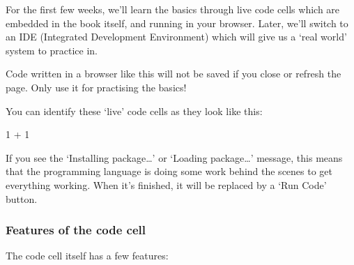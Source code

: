 \documentclass[
  letterpaper,
  DIV=11,
  numbers=noendperiod]{scrreprt}
\newenvironment{Shaded}{\begin{snugshade}}{\end{snugshade}}
\newcommand{\NormalTok}[1]{\textcolor[rgb]{0.00,0.23,0.31}{#1}}
\begin{document}
For the first few weeks, we'll learn the basics through live code cells
which are embedded in the book itself, and running in your browser.
Later, we'll switch to an IDE (Integrated Development Environment) which
will give us a `real world' system to practice in.

\begin{tcolorbox}[enhanced jigsaw, coltitle=black, bottomrule=.15mm, title=\textcolor{quarto-callout-warning-color}{\faExclamationTriangle}\hspace{0.5em}{Warning}, leftrule=.75mm, colframe=quarto-callout-warning-color-frame, breakable, toprule=.15mm, opacityback=0, bottomtitle=1mm, toptitle=1mm, colback=white, rightrule=.15mm, titlerule=0mm, left=2mm, arc=.35mm, opacitybacktitle=0.6, colbacktitle=quarto-callout-warning-color!10!white]

Code written in a browser like this will not be saved if you close or
refresh the page. Only use it for practising the basics!

\end{tcolorbox}

You can identify these `live' code cells as they look like this:

\begin{Shaded}
\begin{Highlighting}[]
\NormalTok{1 + 1}
\end{Highlighting}
\end{Shaded}

If you see the `Installing package\ldots{}' or `Loading package\ldots{}'
message, this means that the programming language is doing some work
behind the scenes to get everything working. When it's finished, it will
be replaced by a `Run Code' button.

\subsubsection{Features of the code
cell}\label{features-of-the-code-cell}

The code cell itself has a few features:
\end{document}
